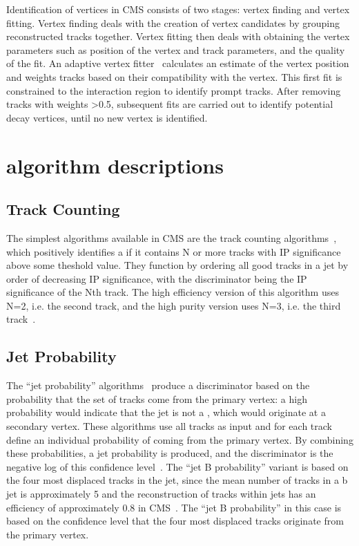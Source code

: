 Identification of vertices in CMS consists of two stages: vertex finding and vertex fitting. Vertex finding
deals with the creation of vertex candidates by grouping reconstructed tracks together. Vertex fitting then
deals with obtaining the vertex parameters such as position of the vertex and track parameters, and the
quality of the fit. An adaptive vertex fitter~\cite{0954-3899-34-12-N01} calculates an estimate of the vertex
position and weights tracks based on their compatibility with the vertex. This first fit is constrained to the
interaction region to identify prompt tracks. After removing tracks with weights >0.5, subsequent fits are
carried out to identify potential decay vertices, until no new vertex is identified.

\section{\btagging algorithm descriptions}
\label{s:btagging_algorithm_descriptions}

\subsection*{Track Counting}
\label{ss:track_counting}
The simplest \btagging algorithms available in CMS are the track counting
algorithms~\cite{CMS-PAS-BTV-09-001}, which positively identifies a \bjet if it contains N or more tracks with
IP significance above some theshold value. They function by ordering all good tracks in a jet by order of
decreasing IP significance, with the discriminator being the IP significance of the Nth track. The high
efficiency version of this algorithm uses N=2, i.e. the second track, and the high purity version uses N=3,
i.e. the third track~\cite{CMS-AN-2005-041}.

\subsection*{Jet Probability}
\label{ss:jet_probability}
The ``jet probability'' algorithms~\cite{CMS-PAS-BTV-09-001} produce a discriminator based on the probability that
the set of tracks come from the primary vertex: a high probability would indicate that the jet is not a \bjet,
which would originate at a secondary vertex. These algorithms use all tracks as input and for each track
define an individual probability of coming from the primary vertex. By combining these probabilities, a jet
probability is produced, and the discriminator is the negative log of this confidence
level~\cite{CMS-AN-2005-041}. The ``jet B probability'' variant is based on the four most displaced tracks in
the jet, since the mean number of tracks in a b jet is approximately 5 and the reconstruction of tracks within
jets has an efficiency of approximately 0.8 in CMS~\cite{CMS-PAS-BTV-09-001}. The ``jet B probability'' in this
case is based on the confidence level that the four most displaced tracks originate from the primary vertex.

